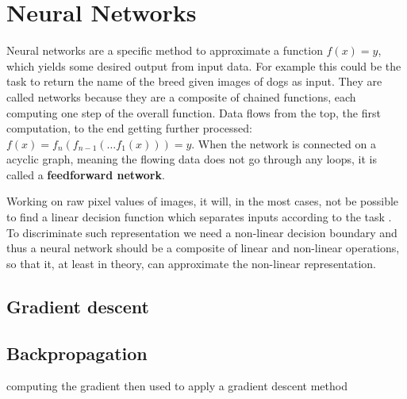 \section{Neural Networks}
\label{sec:concepts:nn}
Neural networks are a specific method to approximate a function $f(x) = y$, which yields some desired output from input data. For example this could be the task to return the name of the breed given images of dogs as input. They are called networks because they are a composite of chained functions, each computing one step of the overall function. Data flows from the top, the first computation, to the end getting further processed: $f(x) = f_n(f_{n-1}(\dots f_1(x))) = y$. When the network is connected on a acyclic graph, meaning the flowing data does not go through any loops, it is called a \textbf{feedforward network}.\\

Working on raw pixel values of images, it will, in the most cases, not be possible to find a linear decision function which separates inputs according to the task \citep{lecun_deep_2015}. To discriminate such representation we need a non-linear decision boundary and thus a neural network should be a composite of linear and non-linear operations, so that it, at least in theory, can approximate the non-linear representation.

\subsection{Gradient descent}
\label{sub:concepts:nn:gd}

\subsection{Backpropagation}
\label{sub:concepts:nn:backprob}
\citet{rumelhart_learning_1988}
computing the gradient then used to apply a gradient descent method

